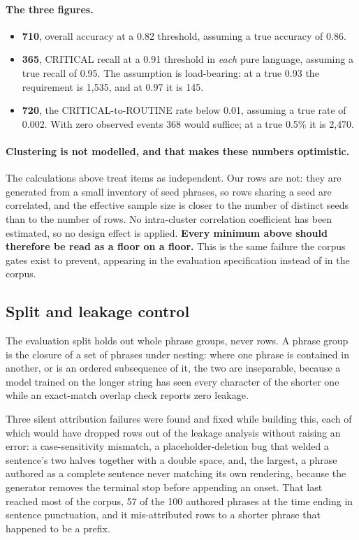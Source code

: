 \paragraph{The three figures.}
\begin{itemize}
\item \textbf{710}, overall accuracy at a 0.82 threshold, assuming a true
  accuracy of 0.86.
\item \textbf{365}, CRITICAL recall at a 0.91 threshold in \emph{each} pure
  language, assuming a true recall of 0.95. The assumption is load-bearing: at a
  true 0.93 the requirement is 1{,}535, and at 0.97 it is 145.
\item \textbf{720}, the CRITICAL-to-ROUTINE rate below 0.01, assuming a true
  rate of 0.002. With zero observed events 368 would suffice; at a true 0.5\%
  it is 2{,}470.
\end{itemize}

\paragraph{Clustering is not modelled, and that makes these numbers
optimistic.} The calculations above treat items as independent. Our rows are
not: they are generated from a small inventory of seed phrases, so rows sharing
a seed are correlated, and the effective sample size is closer to the number of
distinct seeds than to the number of rows. No intra-cluster correlation
coefficient has been estimated, so no design effect is applied. \textbf{Every
minimum above should therefore be read as a floor on a floor.} This is the same
failure the corpus gates exist to prevent, appearing in the evaluation
specification instead of in the corpus.

\subsection{Split and leakage control}

The evaluation split holds out whole phrase groups, never rows. A phrase group is
the closure of a set of phrases under nesting: where one phrase is contained in
another, or is an ordered subsequence of it, the two are inseparable, because a
model trained on the longer string has seen every character of the shorter one
while an exact-match overlap check reports zero leakage.

Three silent attribution failures were found and fixed while building this, each
of which would have dropped rows out of the leakage analysis without raising an
error: a case-sensitivity mismatch, a placeholder-deletion bug that welded a
sentence's two halves together with a double space, and, the largest, a
phrase authored as a complete sentence never matching its own rendering, because
the generator removes the terminal stop before appending an onset. That last
reached most of the corpus, 57 of the 100 authored phrases at the time ending in
sentence punctuation, and it mis-attributed rows to a shorter phrase that happened
to be a prefix.

